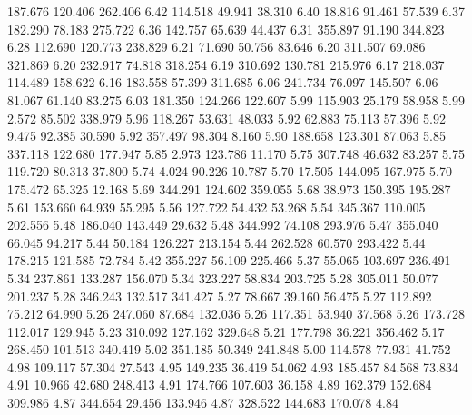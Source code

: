  187.676  120.406  262.406         6.42
 114.518   49.941   38.310         6.40
  18.816   91.461   57.539         6.37
 182.290   78.183  275.722         6.36
 142.757   65.639   44.437         6.31
 355.897   91.190  344.823         6.28
 112.690  120.773  238.829         6.21
  71.690   50.756   83.646         6.20
 311.507   69.086  321.869         6.20
 232.917   74.818  318.254         6.19
 310.692  130.781  215.976         6.17
 218.037  114.489  158.622         6.16
 183.558   57.399  311.685         6.06
 241.734   76.097  145.507         6.06
  81.067   61.140   83.275         6.03
 181.350  124.266  122.607         5.99
 115.903   25.179   58.958         5.99
   2.572   85.502  338.979         5.96
 118.267   53.631   48.033         5.92
  62.883   75.113   57.396         5.92
   9.475   92.385   30.590         5.92
 357.497   98.304    8.160         5.90
 188.658  123.301   87.063         5.85
 337.118  122.680  177.947         5.85
   2.973  123.786   11.170         5.75
 307.748   46.632   83.257         5.75
 119.720   80.313   37.800         5.74
   4.024   90.226   10.787         5.70
  17.505  144.095  167.975         5.70
 175.472   65.325   12.168         5.69
 344.291  124.602  359.055         5.68
  38.973  150.395  195.287         5.61
 153.660   64.939   55.295         5.56
 127.722   54.432   53.268         5.54
 345.367  110.005  202.556         5.48
 186.040  143.449   29.632         5.48
 344.992   74.108  293.976         5.47
 355.040   66.045   94.217         5.44
  50.184  126.227  213.154         5.44
 262.528   60.570  293.422         5.44
 178.215  121.585   72.784         5.42
 355.227   56.109  225.466         5.37
  55.065  103.697  236.491         5.34
 237.861  133.287  156.070         5.34
 323.227   58.834  203.725         5.28
 305.011   50.077  201.237         5.28
 346.243  132.517  341.427         5.27
  78.667   39.160   56.475         5.27
 112.892   75.212   64.990         5.26
 247.060   87.684  132.036         5.26
 117.351   53.940   37.568         5.26
 173.728  112.017  129.945         5.23
 310.092  127.162  329.648         5.21
 177.798   36.221  356.462         5.17
 268.450  101.513  340.419         5.02
 351.185   50.349  241.848         5.00
 114.578   77.931   41.752         4.98
 109.117   57.304   27.543         4.95
 149.235   36.419   54.062         4.93
 185.457   84.568   73.834         4.91
  10.966   42.680  248.413         4.91
 174.766  107.603   36.158         4.89
 162.379  152.684  309.986         4.87
 344.654   29.456  133.946         4.87
 328.522  144.683  170.078         4.84
